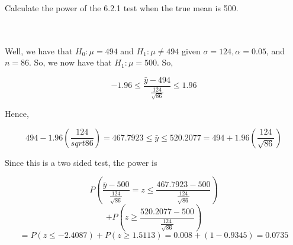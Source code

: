Calculate the power of the 6.2.1 test when the true mean is 500.\\\\

\begin{solution}\renewcommand{\qedsymbol}{}\ \\
    Well, we have that $H_0:\mu=494$ and $H_1:\mu\neq494$ given $\sigma=124, \alpha=0.05$, and $n=86$.
    So, we now have that $H_1:\mu=500$. So,
    
    $$-1.96\leq\frac{\bar{y}-494}{\frac{124}{\sqrt{86}}}\leq1.96$$
    
    Hence,
    
    $$494-1.96(\frac{124}{sqrt{86}})=467.7923\leq\bar{y}\leq520.2077=494+1.96(\frac{124}{\sqrt{86}})$$ 
    
    Since this is a two sided test, the power is
    
    $$P(\frac{\bar{y}-500}{\frac{124}{\sqrt{86}}}=z\leq\frac{467.7923-500}{\frac{124}{\sqrt{86}}})$$
    $$+P(z\geq\frac{520.2077-500}{\frac{124}{\sqrt{86}}})$$
    $$=P(z\leq-2.4087)+P(z\geq1.5113)=0.008+(1-0.9345)=0.0735$$

\end{solution}